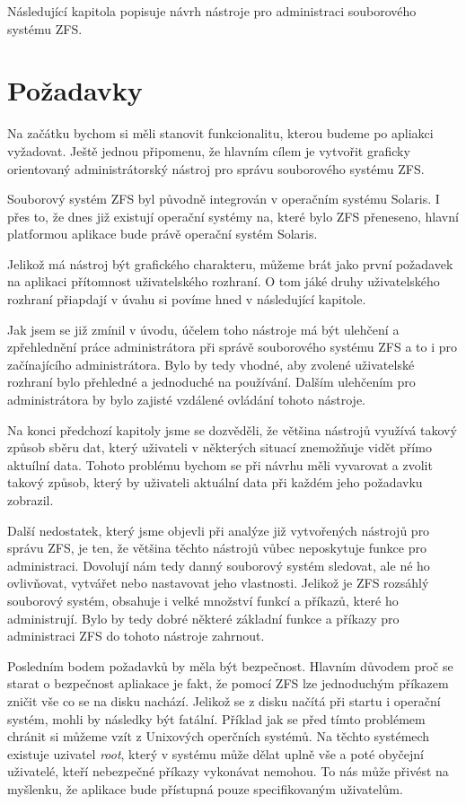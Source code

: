 Následující kapitola popisuje návrh nástroje pro administraci souborového systému ZFS.
\section{Požadavky}
Na začátku bychom si měli stanovit funkcionalitu, kterou budeme po apliakci vyžadovat. Ještě jednou připomenu, že hlavním cílem je vytvořit graficky orientovaný administrátorský nástroj pro správu souborového systému ZFS.

Souborový systém ZFS byl původně integrován v operačním systému Solaris. I přes to, že dnes již existují operační systémy na, které bylo ZFS přeneseno, hlavní platformou aplikace bude právě operační systém Solaris.

Jelikož má nástroj být grafického charakteru, můžeme brát jako první požadavek na aplikaci přítomnost uživatelského rozhraní. O tom jáké druhy uživatelského rozhraní přiapdají v úvahu si povíme hned v následující kapitole.

Jak jsem se již zmínil v úvodu, účelem toho nástroje má být ulehčení a zpřehlednění práce administrátora při správě souborového systému ZFS a to i pro začínajícího administrátora.  Bylo by tedy vhodné, aby zvolené uživatelské rozhraní bylo přehledné a jednoduché na používání. Dalším ulehčením pro administrátora by bylo zajisté vzdálené ovládání tohoto nástroje.

Na konci předchozí kapitoly jsme se dozvěděli, že většina nástrojů využívá takový způsob sběru dat, který uživateli v některých situací znemožňuje vidět přímo aktuílní data. Tohoto problému bychom se při návrhu měli vyvarovat a zvolit takový způsob, který by uživateli aktuální data při každém jeho požadavku zobrazil.

Další nedostatek, který jsme objevli při analýze již vytvořených nástrojů pro správu ZFS, je ten, že většina těchto nástrojů vůbec neposkytuje funkce pro administraci. Dovolují nám tedy danný souborový systém sledovat, ale né ho ovlivňovat, vytvářet nebo nastavovat jeho vlastnosti. Jelikož je ZFS rozsáhlý souborový systém, obsahuje i velké množství funkcí a příkazů, které ho administrují. Bylo by tedy dobré některé základní funkce a příkazy pro administraci ZFS do tohoto nástroje zahrnout.

Posledním bodem požadavků by měla být bezpečnost. Hlavním důvodem proč se starat o bezpečnost apliakace je fakt, že pomocí ZFS lze jednoduchým příkazem zničit vše co se na disku nachází. Jelikož se z disku načítá při startu i operační systém, mohli by následky být fatální. Příklad jak se před tímto problémem chránit si můžeme vzít z Unixových operčních systémů. Na těchto systémech existuje uzivatel \emph{root}, který v systému může dělat uplně vše a poté obyčejní uživatelé, kteří nebezpečné příkazy vykonávat nemohou. To nás může přivést na myšlenku, že aplikace bude přístupná pouze specifikovaným uživatelům.

